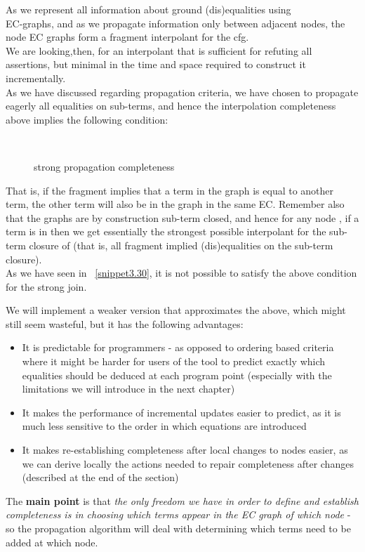 As we represent all information about ground (dis)equalities using \\
EC-graphs, and as we propagate information only between adjacent nodes, 
the node EC graphs form a fragment interpolant for the cfg.\\
We are looking,then, for an interpolant that is sufficient for refuting all assertions, but minimal in the time and space required to construct it incrementally.\\
As we have discussed regarding propagation criteria, we have chosen to propagate eagerly all equalities on sub-terms, 
and hence the interpolation completeness above implies the following condition:
\begin{figure}[H]
\\
\caption{strong propagation completeness}
\label{strong_propagation_completeness}
\end{figure}
That is, if the fragment implies that a term in the graph is equal to another term, 
the other term will also be in the graph in the same EC.
Remember also that the graphs are by construction sub-term closed, and hence for any node , 
if a term  is in  then we get essentially the strongest possible interpolant for the sub-term closure of  (that is, all fragment implied (dis)equalities on the sub-term closure). \\
As we have seen in ~\ref{snippet3.30}, it is not possible to satisfy the above condition for the strong join.

We will implement a weaker version that approximates the above, which might still seem wasteful, but it has the following advantages:
\begin{itemize}
	\item It is predictable for programmers - as opposed to ordering based criteria where it might be harder for users of the tool to predict exactly which equalities should be deduced at each program point (especially with the limitations we will introduce in the next chapter)
	\item It makes the performance of incremental updates easier to predict, as it is much less sensitive to the order in which equations are introduced
	\item It makes re-establishing completeness after local changes to nodes easier, as we can derive locally the actions needed to repair completeness after changes (described at the end of the section)
\end{itemize}
The \textbf{main point} is that  \emph{the only freedom we have in order to define and establish completeness is in choosing which terms appear in the EC graph of which node} - so the propagation algorithm will deal with determining which terms need to be added at which node.

